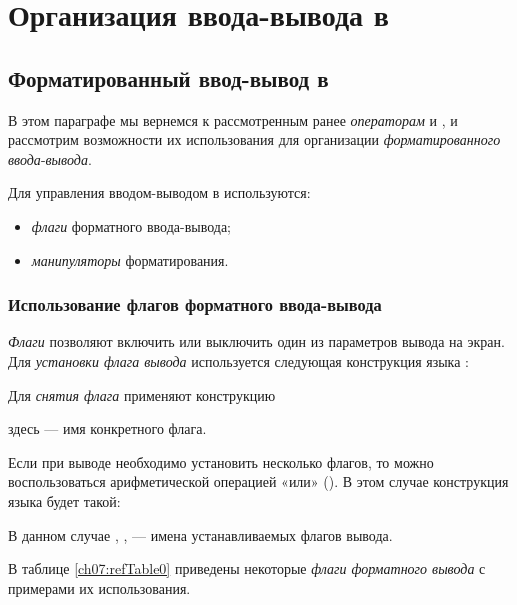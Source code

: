 \chapter[Организация ввода-вывода в \Sys{C++}]{Организация ввода-вывода в }
\section[Форматированный ввод-вывод в \Sys{C++}]{Форматированный ввод-вывод в }
В этом параграфе мы вернемся к рассмотренным ранее \emph{операторам}  и
, и рассмотрим возможности их использования для организации \emph{форматированного 
}\emph{ввода}-\emph{вывода}.


Для управления вводом-выводом в  используются:

\begin{itemize}
\item \emph{флаги} форматного ввода-вывода;
\item \emph{манипуляторы} форматирования.
\end{itemize}

\subsection[Использование флагов форматного ввода-вывода]{Использование флагов форматного ввода-вывода}
\label{ch07:1.1}
\emph{Флаги} позволяют включить или выключить один из параметров вывода
на экран. Для \emph{установки флага вывода} используется следующая конструкция языка
:


Для \emph{снятия флага} применяют конструкцию 


здесь  --- имя конкретного флага.

Если при выводе необходимо установить несколько флагов, то можно воспользоваться арифметической операцией «или»
(\Sys{\textbar}). В этом случае конструкция языка  будет такой:


В данном случае , ,  --- имена устанавливаемых
флагов вывода.

В таблице \ref{ch07:refTable0} приведены некоторые \emph{флаги форматного вывода} с примерами их
использования. 


